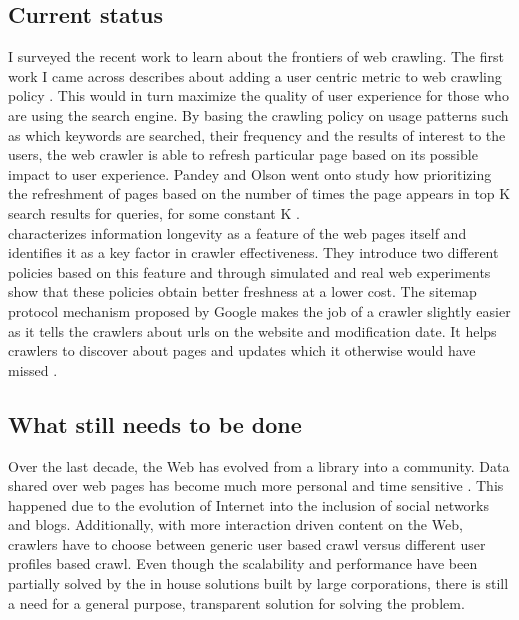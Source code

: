 \documentclass[a4paper, 11pt]{article} %
\begin{document}
\subsection{Current status}

I surveyed the recent work to learn about the frontiers of web crawling. The first work I came across describes about adding a user centric metric to web crawling policy \cite{pandey2005user}. This would in turn maximize the quality of user experience for those who are using the search engine. By basing the crawling policy on usage patterns such as which keywords are searched, their frequency and the results of interest to the users, the web crawler is able to refresh particular page based on its possible impact to user experience. Pandey and Olson went onto study how prioritizing the refreshment of pages based on the number of times the page appears in top K search results for queries, for some constant K \cite{pandey2008crawl}. \\

\cite{olston2008recrawl} characterizes information longevity as a feature of the web pages itself and identifies it as a key factor in crawler effectiveness. They introduce two different policies based on this feature and through simulated and real web experiments show that these policies obtain better freshness at a lower cost. The sitemap protocol mechanism proposed by Google makes the job of a crawler slightly easier as it tells the crawlers about urls on the website and modification date. It helps crawlers to discover about pages and updates which it otherwise would have missed \cite{google2014sitemap}. 

\subsection{What still needs to be done}

Over the last decade, the Web has evolved from a library into a community. Data shared over web pages has become much more personal and time sensitive \cite{cho2010dealing}. This happened due to the evolution of Internet into the inclusion of social networks and blogs. Additionally, with more interaction driven content on the Web, crawlers have to choose between generic user based crawl versus different user profiles based crawl. Even though the scalability and performance have been partially solved by the in house solutions built by large corporations, there is still a need for a general purpose, transparent solution for solving the problem.
\end{document}
